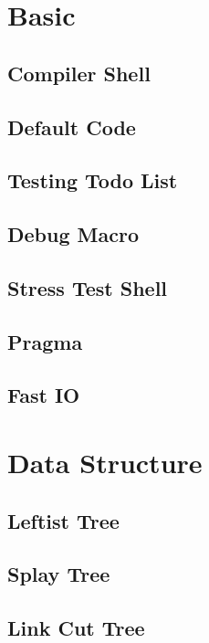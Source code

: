\section{Basic}
\subsection{Compiler Shell}

\subsection{Default Code}

\subsection{Testing Todo List}

\subsection{Debug Macro}

\subsection{Stress Test Shell}

\subsection{Pragma}

\subsection{Fast IO}


\section{Data Structure}
\subsection{Leftist Tree}

\subsection{Splay Tree}

\subsection{Link Cut Tree}

